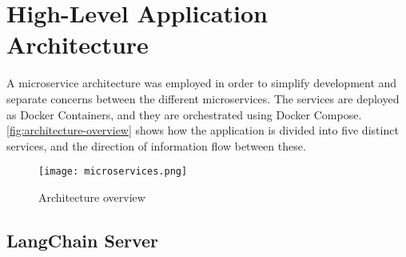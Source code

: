 \begin{comment}
\textit{Phasellus sed ipsum nunc. Nam iaculis felis mauris, sit amet condimentum ex malesuada at. Morbi lacinia odio mi, sit amet pellentesque ante facilisis sit amet. In lobortis elit ut dictum mollis. Aliquam erat volutpat. Morbi sit amet metus nisi. Nulla auctor varius metus at rhoncus. Pellentesque porta mollis leo, eu ultricies nulla mollis ac. Vivamus interdum ac odio vitae sodales. Aenean finibus eros rhoncus molestie elementum. Integer maximus erat vitae purus lobortis iaculis. Etiam blandit varius nulla, sed euismod felis.}

Clearly, a figure showing the architecture is a must, such as Figure~\ref{fig:Architecture}.
Describe all parts of such a figure in reasonable detail in the text, possibly with forward pointers to sections where they will be elaborated on (or backward pointers to sections where tools and methods already have been introduced).
Mention work that motivated your architectural choices, parameter settings, etc.
Those choices should then also be discussed and elaborated on in the Discussion chapter.

\begin{figure}[t!]
    \centering
    \missingfigure{Architecture figure to be added}
    \caption{The missing architecture}
    \label{fig:Architecture}
\end{figure}
\end{comment}

\section{High-Level Application Architecture}

A microservice architecture was employed in order to simplify development and separate concerns between the different microservices. The services are deployed as Docker Containers, and they are orchestrated using Docker Compose.  \autoref{fig:architecture-overview} shows how the application is divided into five distinct services, and the direction of information flow between these.

\begin{figure}[h]
    \centering
    \texttt{[image: microservices.png]}
    \caption{Architecture overview}
    \label{fig:architecture-overview}
\end{figure}



\subsection{LangChain Server}\label{subsec:langchain}

